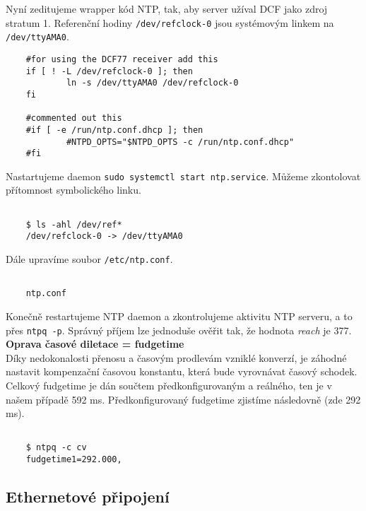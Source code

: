     Nyní zeditujeme wrapper kód NTP, tak, aby server užíval DCF jako zdroj stratum 1.
    Referenční hodiny \verb|/dev/refclock-0| jsou systémovým linkem na
    \verb|/dev/ttyAMA0|.

    \vspace{1em}

    \begin{lstlisting}
    #for using the DCF77 receiver add this
    if [ ! -L /dev/refclock-0 ]; then
            ln -s /dev/ttyAMA0 /dev/refclock-0
    fi

    #commented out this
    #if [ -e /run/ntp.conf.dhcp ]; then
            #NTPD_OPTS="$NTPD_OPTS -c /run/ntp.conf.dhcp"
    #fi
    \end{lstlisting}

    \vspace{1em}

\newpage

    Nastartujeme daemon \verb|sudo systemctl start ntp.service|. Můžeme zkontolovat
    přítomnost symbolického linku.


    \begin{lstlisting}

    $ ls -ahl /dev/ref*
    /dev/refclock-0 -> /dev/ttyAMA0

    \end{lstlisting}

    \vspace{1em}

    Dále upravíme soubor \verb|/etc/ntp.conf|.

    \begin{lstlisting}

    ntp.conf

    \end{lstlisting}

    \vspace{1em}

    Konečně restartujeme NTP daemon a zkontrolujeme aktivitu NTP serveru, a to přes
    \verb|ntpq -p|. Správný příjem lze jednoduše ověřit tak, že hodnota \textit{reach} je
    377.
    \\

    \textbf{Oprava časové diletace = fudgetime}
    \\

    Díky nedokonalosti přenosu a časovým prodlevám vzniklé konverzí, je záhodné nastavit
    kompenzační časovou konstantu, která bude vyrovnávat časový schodek. Celkový fudgetime
    je dán součtem předkonfigurovaným a reálného, ten je v našem případě 592 ms.
    Předkonfigurovaný fudgetime zjistíme následovně (zde 292 ms).

   \begin{lstlisting}

    $ ntpq -c cv
    fudgetime1=292.000,
   \end{lstlisting}

\subsection{Ethernetové připojení}


